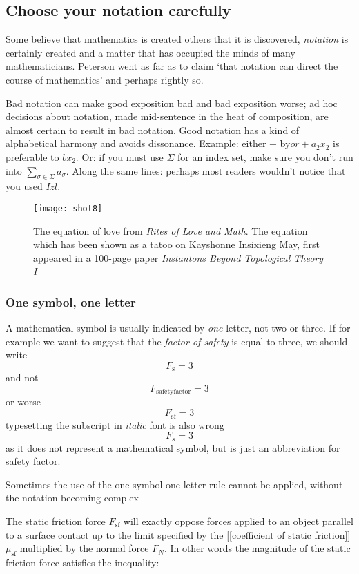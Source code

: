 {\subsection{Choose your notation carefully}

Some believe that mathematics is created others that it is discovered, \emph{notation} is certainly created and
a matter that has occupied the minds of many mathematicians. Peterson \citeyearpar{peterson2009}  went as far as to claim  `that notation can direct the course of mathematics’ and perhaps rightly so.

Bad notation can make good exposition bad and bad exposition worse; ad hoc decisions about notation, made mid-sentence in the heat of composition, are almost certain to result in bad notation. Good notation has a kind of alphabetical harmony and avoids dissonance. Example: either + by$ or +a_2x_2$ is preferable to $bx_2$. Or: if you must use $\Sigma$ for an index set, make sure you don't run into $\sum_{\sigma \in \Sigma}a_\sigma$. Along the same lines: perhaps most readers wouldn't notice that you used $Izl$.

\begin{figure}[htbp]
\texttt{[image: shot8]}
\caption{The equation of love from \emph{Rites of Love and Math}. The equation which has been shown as a tatoo  on Kayshonne Insixieng May, first appeared in a 100-page paper \emph{Instantons Beyond Topological Theory I} \cite{frenkel2012,FLN}}
\end{figure}

\subsubsection{One symbol, one letter}

A mathematical symbol is usually indicated by \emph{one} letter, not two or three. If for example we want to suggest that the \textit{factor of safety} is equal to three, we should write
\[F_{\mathrm{s}}=3\]
and not
\[F_{\mathrm{safetyfactor}}=3\]
or worse
\[F_{\mathrm{sf}}=3\]
typesetting the subscript in \textit{italic} font is also wrong
\[F_{s}=3\]
as it does not represent a mathematical symbol, but is just an abbreviation for safety factor.

Sometimes the use of the one symbol one letter rule cannot be applied, without the notation becoming complex
\medskip

{
\narrower\narrower
The static friction force \(F_{\mathrm{sf}}\) will exactly oppose forces applied to an object parallel to a surface contact up to the limit specified by the [[coefficient of static friction]] \(\mu_{\mathrm{sf}}\) multiplied by the normal force \(F_N\). In other words the magnitude of the static friction force satisfies the inequality:

}}
